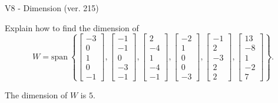 \begin{exercise}
  \begin{exerciseTitle}V8 - Dimension (ver. 215)\end{exerciseTitle}
  \begin{exerciseStatement}
    Explain how to find the dimension of 
\[W=\mathrm{span}\ \left\{\left[\begin{array}{r}
-3 \\
0 \\
1 \\
0 \\
-1
\end{array}\right] , \left[\begin{array}{r}
-1 \\
-1 \\
0 \\
-3 \\
-1
\end{array}\right] , \left[\begin{array}{r}
2 \\
-4 \\
1 \\
-4 \\
-1
\end{array}\right] , \left[\begin{array}{r}
-2 \\
1 \\
0 \\
0 \\
-3
\end{array}\right] , \left[\begin{array}{r}
-1 \\
2 \\
-3 \\
2 \\
2
\end{array}\right] , \left[\begin{array}{r}
13 \\
-8 \\
1 \\
-2 \\
7
\end{array}\right]\right\}.\]



  \end{exerciseStatement}
  \begin{exerciseAnswer}
   The dimension of \(W\) is  \(5\).
  


  \end{exerciseAnswer}
\end{exercise}